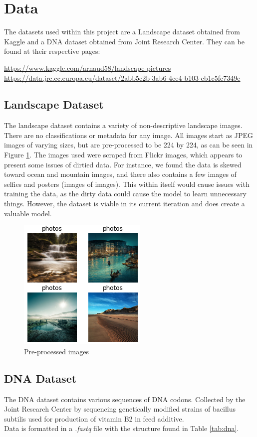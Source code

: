 \documentclass{article}
\begin{document}
	
	\section{Data}
	\label{sec:data}
	The datasets used within this project are a Landscape dataset obtained from Kaggle and a DNA dataset obtained from Joint Research Center. They can be found at their respective pages:
	\begin{center}
		\url{https://www.kaggle.com/arnaud58/landscape-pictures} \\
		\url{https://data.jrc.ec.europa.eu/dataset/2abb5c2b-3ab6-4ce4-b103-cb1c5fc7349e}
	\end{center}

	\subsection{Landscape Dataset}
	The landscape dataset contains a variety of non-descriptive landscape images. There are no classifications or metadata for any image. All images start as JPEG images of varying sizes, but are pre-processed to be 224 by 224, as can be seen in Figure \ref{fig:landscapes}. The images used were scraped from Flickr images, which appears to present some issues of dirtied data. For instance, we found the data is skewed toward ocean and mountain images, and there also contains a few images of selfies and posters (images of images). This within itself would cause issues with training the data, as the dirty data could cause the model to learn unnecessary things. However, the dataset is viable in its current iteration and does create a valuable model.
	
	\begin{figure}[h]
		\centering
		\includegraphics[scale=1]{images/landscapes}
		\caption{Pre-processed images}
		\label{fig:landscapes}
	\end{figure}

	
	\subsection{DNA Dataset}
	The DNA dataset contains various sequences of DNA codons. Collected by the Joint Research Center by sequencing genetically modified strains of bacillus subtilis used for production of vitamin B2 in feed additive. \\
	Data is formatted in a {\em .fastq} file with the structure found in Table \ref{tab:dna}.
	
\end{document}
